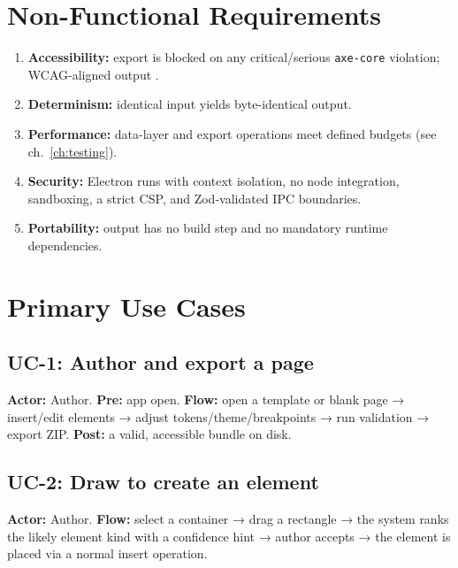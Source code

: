 \section{Non-Functional Requirements}
\begin{enumerate}[label=\textbf{NFR\arabic*.}, leftmargin=3.8em]
  \item \textbf{Accessibility:} export is blocked on any critical/serious
        \texttt{axe-core} violation; WCAG-aligned output \cite{wcag21}.
  \item \textbf{Determinism:} identical input yields byte-identical output.
  \item \textbf{Performance:} data-layer and export operations meet defined
        budgets (see ch.~\ref{ch:testing}).
  \item \textbf{Security:} Electron runs with context isolation, no node
        integration, sandboxing, a strict CSP, and Zod-validated IPC boundaries.
  \item \textbf{Portability:} output has no build step and no mandatory runtime
        dependencies.
\end{enumerate}

\section{Primary Use Cases}

\subsection*{UC-1: Author and export a page}
\textbf{Actor:} Author. \textbf{Pre:} app open. \textbf{Flow:} open a template or
blank page → insert/edit elements → adjust tokens/theme/breakpoints → run
validation → export ZIP. \textbf{Post:} a valid, accessible bundle on disk.

\subsection*{UC-2: Draw to create an element}
\textbf{Actor:} Author. \textbf{Flow:} select a container → drag a rectangle → the
system ranks the likely element kind with a confidence hint → author accepts →
the element is placed via a normal insert operation.


